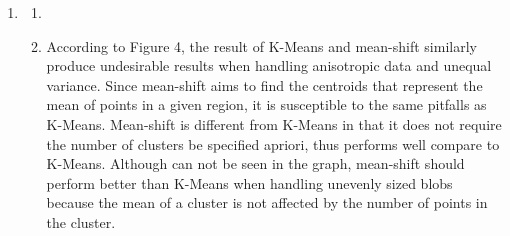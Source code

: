 \documentclass{article}
\begin{document}
\begin{enumerate}
\begin{enumerate}
    \item
    \item
    \end{enumerate}
\item
    \begin{enumerate}
    \item
    \item
        According to Figure 4, the result of K-Means and mean-shift similarly produce undesirable results when handling anisotropic data and unequal variance. Since mean-shift aims to find the centroids that represent the mean of points in a given region, it is susceptible to the same pitfalls as K-Means. Mean-shift is different from K-Means in that it does not require the number of clusters be specified apriori, thus performs well compare to K-Means. Although can not be seen in the graph, mean-shift should perform better than K-Means when handling unevenly sized blobs because the mean of a cluster is not affected by the number of points in the cluster.
    \end{enumerate}
\end{enumerate}
\end{document}
